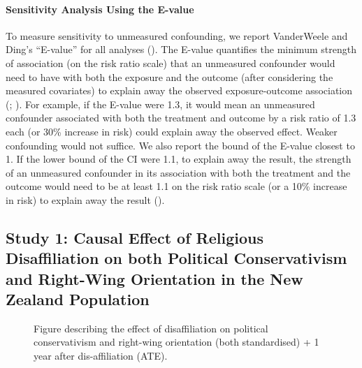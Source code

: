 \documentclass[
  singlecolumn]{article}
\let\oldparagraph\paragraph
\renewcommand{\paragraph}[1]{\oldparagraph{#1}\mbox{}}
\begin{document}
\paragraph{Sensitivity Analysis Using the
E-value}\label{sensitivity-analysis-using-the-e-value}

To measure sensitivity to unmeasured confounding, we report VanderWeele
and Ding's ``E-value'' for all analyses
(). The E-value
quantifies the minimum strength of association (on the risk ratio scale)
that an unmeasured confounder would need to have with both the exposure
and the outcome (after considering the measured covariates) to explain
away the observed exposure-outcome association
(;
). For
example, if the E-value were 1.3, it would mean an unmeasured confounder
associated with both the treatment and outcome by a risk ratio of 1.3
each (or 30\% increase in risk) could explain away the observed effect.
Weaker confounding would not suffice. We also report the bound of the
E-value closest to 1. If the lower bound of the CI were 1.1, to explain
away the result, the strength of an unmeasured confounder in its
association with both the treatment and the outcome would need to be at
least 1.1 on the risk ratio scale (or a 10\% increase in risk) to
explain away the result ().

\newpage{}

\subsection{Study 1: Causal Effect of Religious Disaffiliation on both
Political Conservativism and Right-Wing Orientation in the New Zealand
Population}\label{study-1-causal-effect-of-religious-disaffiliation-on-both-political-conservativism-and-right-wing-orientation-in-the-new-zealand-population}

\begin{figure}


\caption{\label{fig-ate}Figure describing the effect of disaffiliation
on political conservativism and right-wing orientation (both
standardised) + 1 year after dis-affiliation (ATE).}

\end{figure}%
\end{document}
